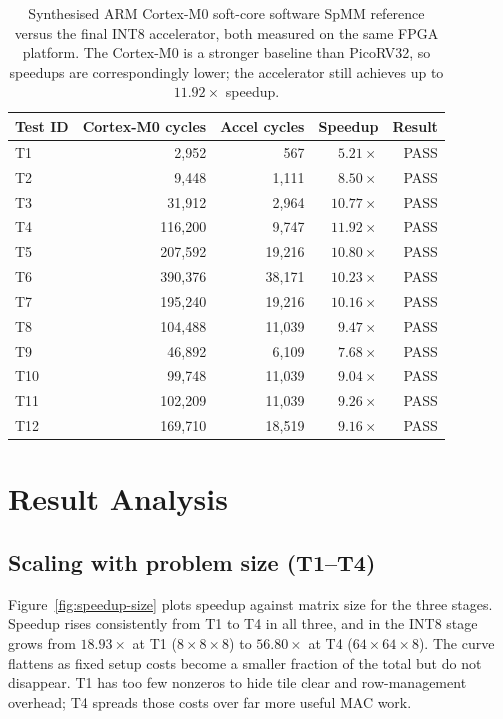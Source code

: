 \begin{table}[htbp]
  \centering
  \small
  \setlength{\tabcolsep}{14pt} %
  \begin{tabular}{lrrrr}
  \toprule
  Test ID & Cortex-M0 cycles & Accel cycles & Speedup & Result \\
  \midrule
  T1  & 2,952   &    567 & $5.21\times$  & PASS \\
  T2  & 9,448   &  1,111 & $8.50\times$  & PASS \\
  T3  & 31,912  &  2,964 & $10.77\times$ & PASS \\
  T4  & 116,200 &  9,747 & $\mathbf{11.92\times}$ & PASS \\
  T5  & 207,592 & 19,216 & $10.80\times$ & PASS \\
  T6  & 390,376 & 38,171 & $10.23\times$ & PASS \\
  T7  & 195,240 & 19,216 & $10.16\times$ & PASS \\
  T8  & 104,488 & 11,039 & $9.47\times$  & PASS \\
  T9  & 46,892  &  6,109 & $7.68\times$  & PASS \\
  T10 & 99,748  & 11,039 & $9.04\times$  & PASS \\
  T11 & 102,209 & 11,039 & $9.26\times$  & PASS \\
  T12 & 169,710 & 18,519 & $9.16\times$  & PASS \\
  \bottomrule
  \end{tabular}
  \caption{Synthesised ARM Cortex-M0 soft-core software SpMM reference
           versus the final INT8 accelerator, both measured on the same
           FPGA platform. The Cortex-M0 is a stronger baseline than
           PicoRV32, so speedups are correspondingly lower; the
           accelerator still achieves up to $11.92\times$ speedup.}
  \label{tab:cortex-results}
\end{table}

\section{Result Analysis}
\label{sec:trend-analysis}

\subsection{Scaling with problem size (T1--T4)}

Figure~\ref{fig:speedup-size} plots speedup against matrix size for
the three stages. Speedup rises consistently from T1
to T4 in all three, and in the INT8 stage grows from $18.93\times$ at
T1 ($8 \times 8 \times 8$) to $56.80\times$ at T4
($64 \times 64 \times 8$). The curve flattens as fixed setup costs
become a smaller fraction of the total but do not disappear. T1 has too
few nonzeros to hide tile clear and row-management overhead; T4 spreads
those costs over far more useful MAC work.

